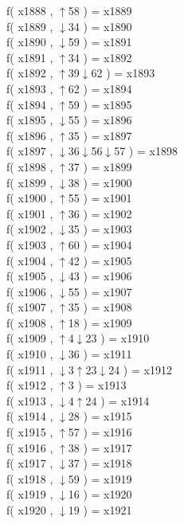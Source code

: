 f( x1888 , $\uparrow$58 ) = x1889 \\
f( x1889 , $\downarrow$34 ) = x1890 \\
f( x1890 , $\downarrow$59 ) = x1891 \\
f( x1891 , $\uparrow$34 ) = x1892 \\
f( x1892 , $\uparrow$39$\downarrow$62 ) = x1893 \\
f( x1893 , $\uparrow$62 ) = x1894 \\
f( x1894 , $\uparrow$59 ) = x1895 \\
f( x1895 , $\downarrow$55 ) = x1896 \\
f( x1896 , $\uparrow$35 ) = x1897 \\
f( x1897 , $\downarrow$36$\downarrow$56$\downarrow$57 ) = x1898 \\
f( x1898 , $\uparrow$37 ) = x1899 \\
f( x1899 , $\downarrow$38 ) = x1900 \\
f( x1900 , $\uparrow$55 ) = x1901 \\
f( x1901 , $\uparrow$36 ) = x1902 \\
f( x1902 , $\downarrow$35 ) = x1903 \\
f( x1903 , $\uparrow$60 ) = x1904 \\
f( x1904 , $\uparrow$42 ) = x1905 \\
f( x1905 , $\downarrow$43 ) = x1906 \\
f( x1906 , $\downarrow$55 ) = x1907 \\
f( x1907 , $\uparrow$35 ) = x1908 \\
f( x1908 , $\uparrow$18 ) = x1909 \\
f( x1909 , $\uparrow$4$\downarrow$23 ) = x1910 \\
f( x1910 , $\downarrow$36 ) = x1911 \\
f( x1911 , $\downarrow$3$\uparrow$23$\downarrow$24 ) = x1912 \\
f( x1912 , $\uparrow$3 ) = x1913 \\
f( x1913 , $\downarrow$4$\uparrow$24 ) = x1914 \\
f( x1914 , $\downarrow$28 ) = x1915 \\
f( x1915 , $\uparrow$57 ) = x1916 \\
f( x1916 , $\uparrow$38 ) = x1917 \\
f( x1917 , $\downarrow$37 ) = x1918 \\
f( x1918 , $\downarrow$59 ) = x1919 \\
f( x1919 , $\downarrow$16 ) = x1920 \\
f( x1920 , $\downarrow$19 ) = x1921 \\

